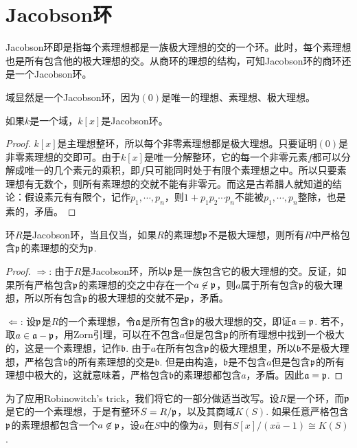 \section{Jacobson环}

\begin{para}[Jacobson环]
	Jacobson环即是指每个素理想都是一族极大理想的交的一个环。此时，每个素理想也是所有包含他的极大理想的交。从商环的理想的结构，可知Jacobson环的商环还是一个Jacobson环。
\end{para}

域显然是一个Jacobson环，因为$(0)$是唯一的理想、素理想、极大理想。

\begin{lem}
	如果$k$是一个域，$k[x]$是Jacobson环。
\end{lem}

\begin{proof}
	$k[x]$是主理想整环，所以每个非零素理想都是极大理想。只要证明$(0)$是非零素理想的交即可。由于$k[x]$是唯一分解整环，它的每一个非零元素$f$都可以分解成唯一的几个素元的乘积，即$f$只可能同时处于有限个素理想之中。所以只要素理想有无数个，则所有素理想的交就不能有非零元。而这是古希腊人就知道的结论：假设素元有有限个，记作$p_1,\cdots,p_n$，则$1+p_1p_2\cdots p_n$不能被$p_1,\cdots,p_n$整除，也是素的，矛盾。
\end{proof}

\begin{pro}
环$R$是Jacobson环，当且仅当，如果$R$的素理想$\mathfrak{p}$不是极大理想，则所有$R$中严格包含$\mathfrak{p}$的素理想的交为$\mathfrak{p}$.
\end{pro}

\begin{proof} $\Rightarrow$: 由于$R$是Jacobson环，所以$\mathfrak{p}$是一族包含它的极大理想的交。反证，如果所有严格包含$\mathfrak{p}$的素理想的交之中存在一个$a\not\in \mathfrak{p}$，则$a$属于所有包含$\mathfrak{p}$的极大理想，所以所有包含$\mathfrak{p}$的极大理想的交就不是$\mathfrak{p}$，矛盾。

$\Leftarrow$: 设$\mathfrak{p}$是$R$的一个素理想，令$\mathfrak{a}$是所有包含$\mathfrak{p}$的极大理想的交，即证$\mathfrak{a}=\mathfrak{p}$. 若不，取$a\in \mathfrak{a}-\mathfrak{p}$，用Zorn引理，可以在不包含$a$但是包含$\mathfrak{p}$的所有理想中找到一个极大的，这是一个素理想，记作$\mathfrak{b}$. 由于$a$在所有包含$\mathfrak{p}$的极大理想里，所以$\mathfrak{b}$不是极大理想，严格包含$\mathfrak{b}$的所有素理想的交是$\mathfrak{b}$. 但是由构造，$\mathfrak{b}$是不包含$a$但是包含$\mathfrak{p}$的所有理想中极大的，这就意味着，严格包含$\mathfrak{b}$的素理想都包含$a$，矛盾。因此$\mathfrak{a}=\mathfrak{p}$.\end{proof}

为了应用Robinowitch's trick，我们将它的一部分做适当改写。设$R$是一个环，而$\mathfrak{p}$是它的一个素理想，于是有整环$S=R/\mathfrak{p}$，以及其商域$K(S)$. 如果任意严格包含$\mathfrak{p}$的素理想都包含一个$a\not\in \mathfrak{p}$，设$a$在$S$中的像为$\bar{a}$，则有$S[x]/(x\bar{a}-1)\cong K(S)$.

